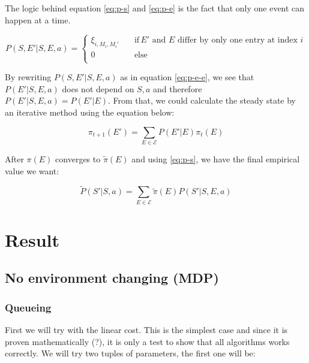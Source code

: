 \documentclass[
  a4paper, xcolor = usenames,dvipsnames]{article}
\begin{document}
The logic behind equation \eqref{eq:p-s} and \eqref{eq:p-e} is the fact that only one event can happen at a time.

\begin{equation}
  P(S, E'|S, E, a) = 
    \begin{cases}
        \xi_{i, M_{i}, M_{i}'} \quad & \text{if} \, E' \text{ and } E \text{ differ by only one entry at index } i \\
        0 \quad & \text{else} \\
    \end{cases}
\label{eq:p-e-e}
\end{equation}

By rewriting \(P(S, E' | S, E, a)\) as in equation \eqref{eq:p-e-e}, we see that \(P(E'|S, E, a)\) does not depend on \(S, a\) and therefore \(P(E'|S, E, a) = P(E'| E)\). From that, we could calculate the steady state by an iterative method using the equation below:

\begin{equation}
\label{eqn:steady_prob}
    \pi_{t + 1}(E') = \sum_{E \in \mathcal{E}} P(E'| E) \pi_{t}(E)
\end{equation}

After \(\pi(E)\) converges to \(\tilde{\pi}(E)\) and using \eqref{eq:p-s}, we have the final empirical value we want:

\begin{equation}
\label{eqn:p_tilde}
    \tilde{P}(S'| S, a) = \sum_{E \in \mathcal{E}} \tilde{\pi}(E) P(S'| S, E, a)
\end{equation}

\hypertarget{result}{%
\section{Result}\label{result}}

\hypertarget{no-environment-changing-mdp}{%
\subsection{No environment changing (MDP)}\label{no-environment-changing-mdp}}

\hypertarget{queueing}{%
\subsubsection{Queueing}\label{queueing}}

First we will try with the linear cost. This is the simplest case and since it is proven mathematically (?), it is only a test to show that all algorithms works correctly. We will try two tuples of parameters, the first one will be:
\end{document}
